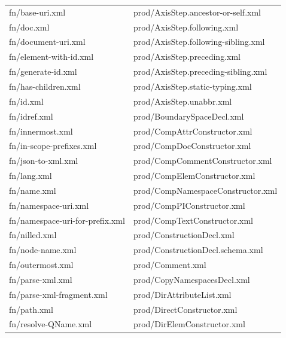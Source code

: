 \begin{table}[h!]
	\centering
	\begin{tabular}{|l|l|} 
		\hline
		fn/base-uri.xml                 & prod/AxisStep.ancestor-or-self.xml   \\
		fn/doc.xml                      & prod/AxisStep.following.xml          \\
		fn/document-uri.xml             & prod/AxisStep.following-sibling.xml  \\
		fn/element-with-id.xml          & prod/AxisStep.preceding.xml          \\
		fn/generate-id.xml              & prod/AxisStep.preceding-sibling.xml  \\
		fn/has-children.xml             & prod/AxisStep.static-typing.xml      \\
		fn/id.xml                       & prod/AxisStep.unabbr.xml             \\
		fn/idref.xml                    & prod/BoundarySpaceDecl.xml           \\
		fn/innermost.xml                & prod/CompAttrConstructor.xml         \\
		fn/in-scope-prefixes.xml        & prod/CompDocConstructor.xml          \\
		fn/json-to-xml.xml              & prod/CompCommentConstructor.xml      \\
		fn/lang.xml                     & prod/CompElemConstructor.xml         \\
		fn/name.xml                     & prod/CompNamespaceConstructor.xml    \\
		fn/namespace-uri.xml            & prod/CompPIConstructor.xml           \\
		fn/namespace-uri-for-prefix.xml & prod/CompTextConstructor.xml         \\
		fn/nilled.xml                   & prod/ConstructionDecl.xml            \\
		fn/node-name.xml                & prod/ConstructionDecl.schema.xml     \\
		fn/outermost.xml                & prod/Comment.xml                     \\
		fn/parse-xml.xml                & prod/CopyNamespacesDecl.xml          \\
		fn/parse-xml-fragment.xml       & prod/DirAttributeList.xml            \\
		fn/path.xml                     & prod/DirectConstructor.xml           \\
		fn/resolve-QName.xml            & prod/DirElemConstructor.xml          \\

\end{tabular}
\end{table}
